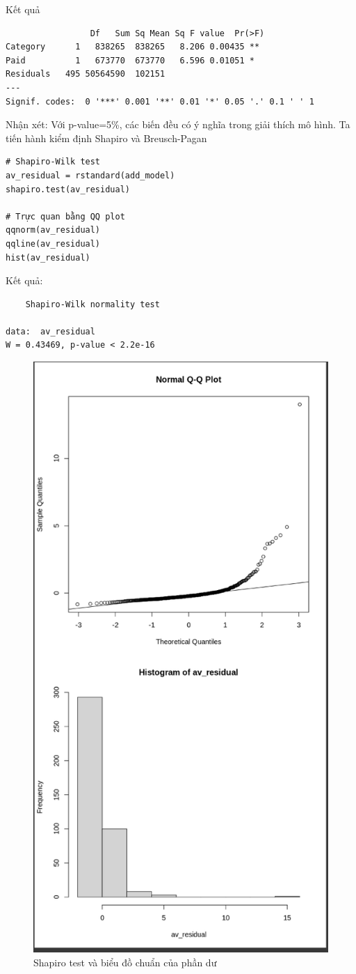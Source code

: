 \begin{itemize}
Kết quả
\begin{lstlisting}
                 Df   Sum Sq Mean Sq F value  Pr(>F)   
Category      1   838265  838265   8.206 0.00435 **
Paid          1   673770  673770   6.596 0.01051 * 
Residuals   495 50564590  102151                   
---
Signif. codes:  0 '***' 0.001 '**' 0.01 '*' 0.05 '.' 0.1 ' ' 1
\end{lstlisting}

Nhận xét: Với p-value=5\%, các biến đều có ý nghĩa trong giải thích mô hình. Ta tiến hành kiểm định Shapiro và Breusch-Pagan

\begin{lstlisting}
# Shapiro-Wilk test
av_residual = rstandard(add_model)
shapiro.test(av_residual)

# Trực quan bằng QQ plot
qqnorm(av_residual)
qqline(av_residual)
hist(av_residual)
\end{lstlisting}

Kết quả:
\begin{lstlisting}
	Shapiro-Wilk normality test

data:  av_residual
W = 0.43469, p-value < 2.2e-16
\end{lstlisting}

\begin{figure}[H]
    \centering
    \includegraphics[width=0.6\linewidth]{part23_figures/21.png}
    \caption{Shapiro test và biểu đồ chuẩn của phần dư}
    \label{fig:Shapiro test và biểu đồ chuẩn của phần dư}
\end{figure}


\end{itemize}
